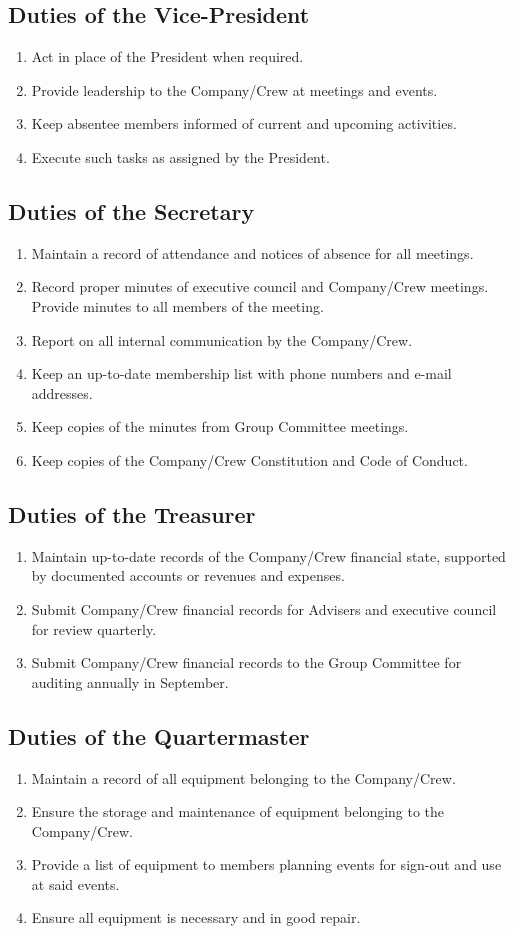 \documentclass{Service_Corps_Document}
\begin{document}
\subsection{Duties of the Vice-President}
\begin{enumerate}
	\item Act in place of the President when required.
	\item Provide leadership to the Company/Crew at meetings and events. 
	\item Keep absentee members informed of current and upcoming activities.
	\item Execute such tasks as assigned by the President.
\end{enumerate}
\subsection{Duties of the Secretary}
\begin{enumerate}
	\item Maintain a record of attendance and notices of absence for all meetings.
	\item Record proper minutes of executive council and Company/Crew meetings. Provide minutes to all members of the meeting.
	\item Report on all internal communication by the Company/Crew.
	\item Keep an up-to-date membership list with phone numbers and e-mail addresses.
	\item Keep copies of the minutes from Group Committee meetings. 
	\item Keep copies of the Company/Crew Constitution and Code of Conduct.
\end{enumerate}
\subsection{Duties of the Treasurer}
\begin{enumerate}
	\item Maintain up-to-date records of the Company/Crew financial state, supported by documented accounts or revenues and expenses.
	\item Submit Company/Crew financial records for Advisers and executive council for review quarterly.
	\item Submit Company/Crew financial records to the Group Committee for auditing annually in September. 
\end{enumerate}
\subsection{Duties of the Quartermaster}
\begin{enumerate}
	\item Maintain a record of all equipment belonging to the Company/Crew.
	\item Ensure the storage and maintenance of equipment belonging to the Company/Crew.
	\item Provide a list of equipment to members planning events for sign-out and use at said events.
	\item Ensure all equipment is necessary and in good repair. 
\end{enumerate}
\end{document}
